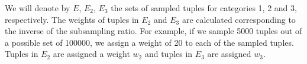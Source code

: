 \documentclass[akbc,twoside,11pt]{article}
\newcounter{example}
\begin{document}
We will denote by $E$, $E_2$, $E_3$ the sets of sampled tuples for categories 1, 2 and 3, respectively.
The weights of tuples in $E_2$ and $E_3$ are calculated corresponding to the inverse of the subsampling ratio. For example, if we sample 5000 tuples out of a possible set of 100000, we assign a weight of 20 to each of the sampled tuples. Tuples in $E_2$ are assigned a weight $w_2$ and tuples in $E_3$ are assigned $w_3$. %

\end{document}
